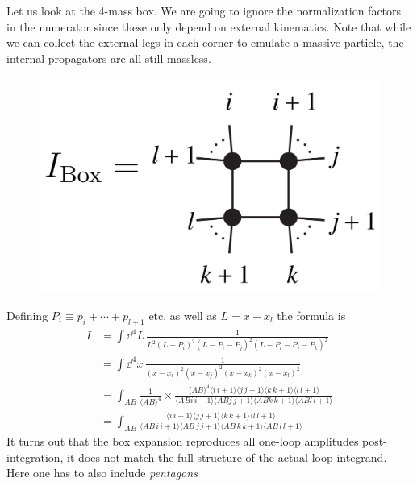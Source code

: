 \documentclass[letter,12pt]{article}
\newcommand{\la}{\langle}
\newcommand{\ra}{\rangle}
\begin{document}
Let us look at the 4-mass box. We are going to ignore the normalization factors in the numerator since these only depend on external kinematics. Note that while we can collect the external legs in each corner to emulate a massive particle, the internal propagators are all still massless.
 \begin{figure}[H]
	\centering
	\includegraphics[width=0.4\linewidth]{fourmass}
	\caption{}
	\label{fig:fourmass}
\end{figure}
Defining $P_i\equiv p_i+\cdots+p_{l+1}$ etc, as well as $L=x-x_l$ the formula is
\begin{equation}
	\begin{aligned}
		I & = \int \dd^4 L\, \frac{1}{L^2(L-P_i)^2(L-P_i-P_j)^2(L-P_i-P_j-P_k)^2}\\
		& = \int \dd^4 x\, \frac{1}{(x-x_i)^2(x-x_j)^2(x-x_k)^2(x-x_l)^2}\\
		& = \int_{A B}\frac{1}{\la A B \ra^4}\times \frac{\la AB \ra^4\la i\,i+1 \ra \la j\,j+1 \ra \la k\,k+1 \ra \la l\,l+1 \ra}{\la A B i\,i+1 \ra \la A B j\,j+1 \ra \la A B k\,k+1 \ra \la A B l\,l+1 \ra}\\
		& = \int_{A B} \frac{\la i\,i+1 \ra \la j\,j+1 \ra \la k\,k+1 \ra \la l\,l+1 \ra}{\la A B \,i\,i+1 \ra \la A B \,j\,j+1 \ra \la A B\, k\,k+1 \ra \la A B\, l\,l+1 \ra}
	\end{aligned}
\end{equation}
It turns out that the box expansion reproduces all one-loop amplitudes post- integration, it does not match the full structure of the actual loop integrand. Here one has to also include \textit{pentagons}
\end{document}
